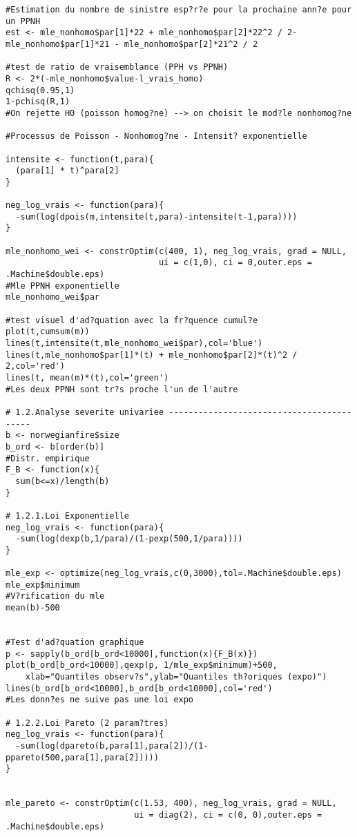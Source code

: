 \begin{verbatim}
#Estimation du nombre de sinistre esp?r?e pour la prochaine ann?e pour un PPNH
est <- mle_nonhomo$par[1]*22 + mle_nonhomo$par[2]*22^2 / 2-mle_nonhomo$par[1]*21 - mle_nonhomo$par[2]*21^2 / 2

#test de ratio de vraisemblance (PPH vs PPNH)
R <- 2*(-mle_nonhomo$value-l_vrais_homo)
qchisq(0.95,1)
1-pchisq(R,1)
#On rejette H0 (poisson homog?ne) --> on choisit le mod?le nonhomog?ne

#Processus de Poisson - Nonhomog?ne - Intensit? exponentielle

intensite <- function(t,para){
  (para[1] * t)^para[2]
}

neg_log_vrais <- function(para){
  -sum(log(dpois(m,intensite(t,para)-intensite(t-1,para))))
}

mle_nonhomo_wei <- constrOptim(c(400, 1), neg_log_vrais, grad = NULL, 
                               ui = c(1,0), ci = 0,outer.eps = .Machine$double.eps)
#Mle PPNH exponentielle
mle_nonhomo_wei$par

#test visuel d'ad?quation avec la fr?quence cumul?e
plot(t,cumsum(m))
lines(t,intensite(t,mle_nonhomo_wei$par),col='blue')
lines(t,mle_nonhomo$par[1]*(t) + mle_nonhomo$par[2]*(t)^2 / 2,col='red')
lines(t, mean(m)*(t),col='green')
#Les deux PPNH sont tr?s proche l'un de l'autre

# 1.2.Analyse severite univariee ------------------------------------------
b <- norwegianfire$size
b_ord <- b[order(b)]
#Distr. empirique
F_B <- function(x){
  sum(b<=x)/length(b)
}

# 1.2.1.Loi Exponentielle
neg_log_vrais <- function(para){
  -sum(log(dexp(b,1/para)/(1-pexp(500,1/para))))
}

mle_exp <- optimize(neg_log_vrais,c(0,3000),tol=.Machine$double.eps)
mle_exp$minimum
#V?rification du mle
mean(b)-500


#Test d'ad?quation graphique
p <- sapply(b_ord[b_ord<10000],function(x){F_B(x)})
plot(b_ord[b_ord<10000],qexp(p, 1/mle_exp$minimum)+500,
	xlab="Quantiles observ?s",ylab="Quantiles th?oriques (expo)")
lines(b_ord[b_ord<10000],b_ord[b_ord<10000],col='red')
#Les donn?es ne suive pas une loi expo

# 1.2.2.Loi Pareto (2 param?tres)
neg_log_vrais <- function(para){
  -sum(log(dpareto(b,para[1],para[2])/(1-ppareto(500,para[1],para[2]))))
}


mle_pareto <- constrOptim(c(1.53, 400), neg_log_vrais, grad = NULL, 
                          ui = diag(2), ci = c(0, 0),outer.eps = .Machine$double.eps)


\end{verbatim}
